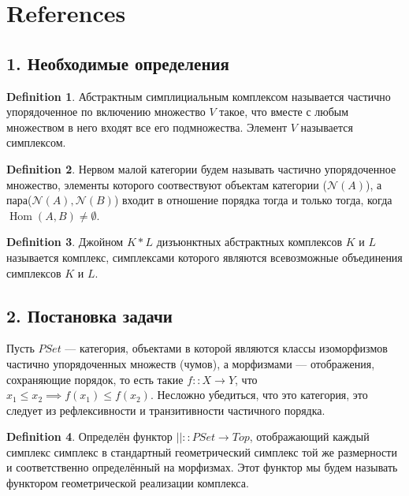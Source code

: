 \documentclass[a4paper, 12pt]{article}
\theoremstyle{definition}
\newtheorem{definition}{Definition}
\theoremstyle{remark}
\begin{document}
\section{References}

\subsection*{1. Необходимые определения}

\begin{definition}
Абстрактным симплициальным комплексом называется частично упорядоченное по включению множество $V$ такое, что вместе с любым множеством в него входят все его подмножества. Элемент $V$ называется симплексом.
\end{definition}

\begin{definition}
Нервом малой категории будем называть частично упорядоченное множество, элементы которого соотвествуют объектам категории ($\mathcal{N}(A)$), а пара($\mathcal{N}(A),\mathcal{N}(B)$) входит в отношение порядка тогда и только тогда, когда $\operatorname{Hom}(A,B) \neq \emptyset$.
\end{definition}

\begin{definition}
Джойном $K * L$ дизъюнктных абстрактных комплексов $K$ и $L$ называется комплекс, симплексами которого являются всевозможные объединения симплексов $K$ и $L$.
\end{definition}

\subsection*{2. Постановка задачи}

Пусть $PSet$ --- категория, объектами в которой являются классы изоморфизмов частично упорядоченных множеств (чумов), а морфизмами --- отображения, сохраняющие порядок, то есть такие $f :: X \to Y$, что $x_1 \leq x_2 \implies f(x_1) \leq f(x_2)$. Несложно убедиться, что это категория, это следует из рефлексивности и транзитивности частичного порядка.\\

\begin{definition}
Определён функтор $|| :: PSet \to Top$, отображающий каждый симплекс симплекс в стандартный геометрический симплекс той же размерности и соответственно определённый на морфизмах. Этот функтор мы будем называть функтором геометрической реализации комплекса.
\end{definition}
\end{document}
